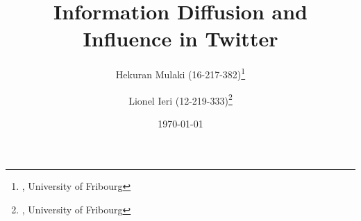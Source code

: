 \documentclass[a4paper,12pt]{article}
\begin{document}

\title{Information Diffusion and Influence in Twitter } %

\author{Hekuran Mulaki (16-217-382)\thanks{, University of Fribourg}
    \and Lionel Ieri (12-219-333)\thanks{, University of Fribourg}
   }	%



\date{\today} %

\maketitle







\newpage



\end{document}
